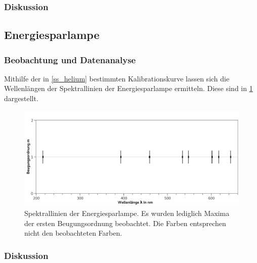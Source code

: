 \documentclass[
	a4paper,
	12pt,
	pagesize,
	ngerman
]{scrartcl}
\begin{document}
	\subsubsection{Diskussion}
	
	\subsection{Energiesparlampe}
	\subsubsection{Beobachtung und Datenanalyse}
	Mithilfe der in \cref{ss_helium} bestimmten Kalibrationskurve lassen sich die Wellenlängen der Spektrallinien der Energiesparlampe ermitteln.
	Diese sind in \cref{fig_spar} dargestellt.


	\begin{figure}[H] 
		\includegraphics[width=1\textwidth]{fig_spar} 
		\centering
		\caption{Spektrallinien der Energiesparlampe. 
		Es wurden lediglich Maxima der ersten Beugungsordnung beobachtet. %
		Die Farben entsprechen nicht den beobachteten Farben.}
		\label{fig_spar}
		\centering
	\end{figure}
	
	\subsubsection{Diskussion}
	
\end{document}
